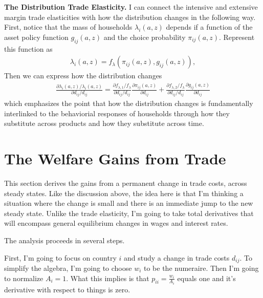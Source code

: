 \documentclass[12pt,pdftex]{article}
\begin{document}
\begin{onehalfspacing}
\textbf{The Distribution Trade Elasticity.} I can connect the intensive and extensive margin trade elasticities with how the distribution changes in the following way. First, notice that the mass of households $\lambda_{i}(a,z)$ depends if a function of the asset policy function $g_{ij}(a,z)$ and the choice probability $\pi_{ij}(a,z)$. Represent this function as
\begin{align}
\lambda_{i}(a,z) = f_{\lambda}(\pi_{ij}(a,z),g_{ij}(a,z)),
\end{align}
Then we can express how the distribution changes
\begin{align}
\frac{\partial \lambda_{i}(a,z)/\lambda_{i}(a,z)}{\partial d_{ij}/d_{ij}}  = \frac{\partial f_{\lambda, 1} / f_{\lambda} }{\partial d_{ij}/d_{ij}} \frac{\partial \pi_{ij}(a,z)}{\partial d_{ij}} +
\frac{\partial f_{\lambda, 2} / f_{\lambda} }{\partial d_{ij}/d_{ij}} \frac{\partial g_{ij}(a,z)}{\partial d_{ij}}
\label{eq:apx-distribution-margin}
\end{align}
which emphasizes the point that how the distribution changes is fundamentally interlinked to the behaviorial responses of households through how they substitute across products and how they substitute across time.

\section{The Welfare Gains from Trade}

This section derives the gains from a permanent change in trade costs, across steady states. Like the discussion above, the idea here is that I'm thinking a situation where the change is small and there is an immediate jump to the new steady state. Unlike the trade elasticity, I'm going to take total derivatives that will encompass general equilibrium changes in wages and interest rates.

The analysis proceeds in several steps.

First, I'm going to focus on country $i$ and study a change in trade costs $d_{ij}$. To simplify the algebra, I'm going to choose $w_i$ to be the numeraire. Then I'm going to normalize $A_i = 1$. What this implies is that $p_{ii} = \frac{w_i}{A_i}$ equals one and it's derivative with respect to things is zero.


\end{onehalfspacing}
\end{document}
